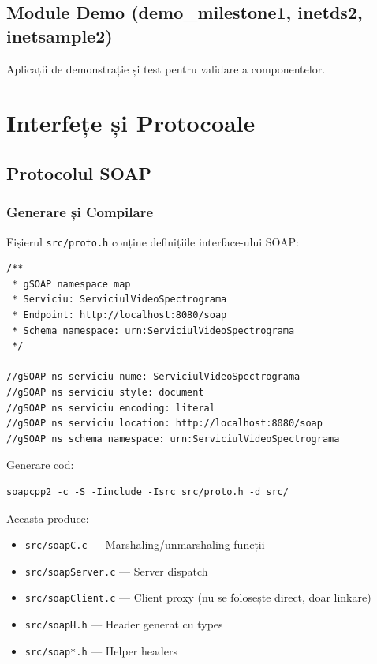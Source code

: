 \documentclass[12pt,a4paper,twoside]{article}
\begin{document}
\subsection{Module Demo (demo\_milestone1, inetds2, inetsample2)}

Aplicații de demonstrație și test pentru validare a componentelor.

\section{Interfețe și Protocoale}

\subsection{Protocolul SOAP}

\subsubsection{Generare și Compilare}

Fișierul \texttt{src/proto.h} conține definițiile interface-ului SOAP:

\begin{lstlisting}
/**
 * gSOAP namespace map
 * Serviciu: ServiciulVideoSpectrograma
 * Endpoint: http://localhost:8080/soap
 * Schema namespace: urn:ServiciulVideoSpectrograma
 */

//gSOAP ns serviciu nume: ServiciulVideoSpectrograma
//gSOAP ns serviciu style: document
//gSOAP ns serviciu encoding: literal
//gSOAP ns serviciu location: http://localhost:8080/soap
//gSOAP ns schema namespace: urn:ServiciulVideoSpectrograma
\end{lstlisting}

Generare cod:
\begin{lstlisting}
soapcpp2 -c -S -Iinclude -Isrc src/proto.h -d src/
\end{lstlisting}

Aceasta produce:
\begin{itemize}
    \item \texttt{src/soapC.c} --- Marshaling/unmarshaling funcții
    \item \texttt{src/soapServer.c} --- Server dispatch
    \item \texttt{src/soapClient.c} --- Client proxy (nu se folosește direct, doar linkare)
    \item \texttt{src/soapH.h} --- Header generat cu types
    \item \texttt{src/soap*.h} --- Helper headers
\end{itemize}
\end{document}
